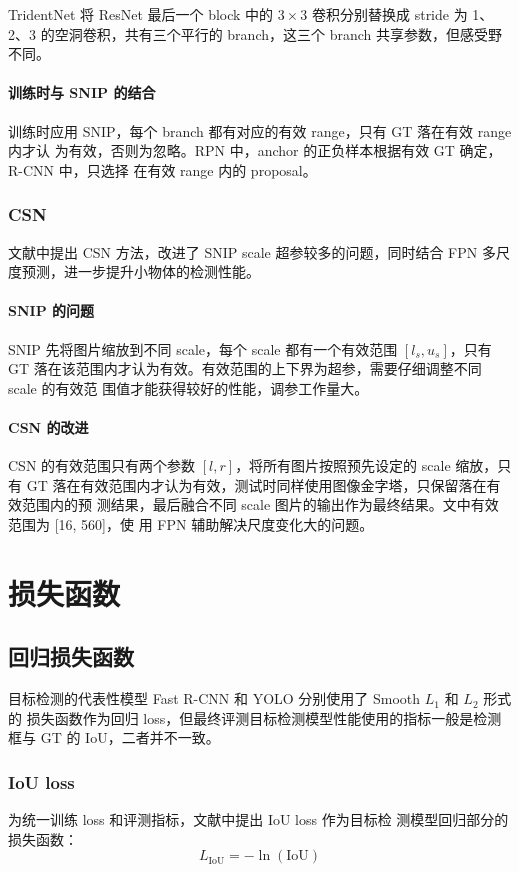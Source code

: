 TridentNet 将 ResNet 最后一个 block 中的 $3 \times 3$ 卷积分别替换成 stride 为
1、2、3 的空洞卷积，共有三个平行的 branch，这三个 branch 共享参数，但感受野不同。

\paragraph{训练时与 SNIP 的结合}
训练时应用 SNIP，每个 branch 都有对应的有效 range，只有 GT 落在有效 range 内才认
为有效，否则为忽略。RPN 中，anchor 的正负样本根据有效 GT 确定，R-CNN 中，只选择
在有效 range 内的 proposal。

\subsubsection{CSN}
文献中提出 CSN 方法，改进了 SNIP scale 超参较多的问题，同时结合
FPN 多尺度预测，进一步提升小物体的检测性能。 

\paragraph{SNIP 的问题}
SNIP 先将图片缩放到不同 scale，每个 scale 都有一个有效范围 $[l_s, u_s]$，只有 GT
落在该范围内才认为有效。有效范围的上下界为超参，需要仔细调整不同 scale 的有效范
围值才能获得较好的性能，调参工作量大。

\paragraph{CSN 的改进}
CSN 的有效范围只有两个参数 $[l, r]$，将所有图片按照预先设定的 scale 缩放，只有
GT 落在有效范围内才认为有效，测试时同样使用图像金字塔，只保留落在有效范围内的预
测结果，最后融合不同 scale 图片的输出作为最终结果。文中有效范围为 [16, 560]，使
用 FPN 辅助解决尺度变化大的问题。

\section{损失函数}
\subsection{回归损失函数}
目标检测的代表性模型 Fast R-CNN 和 YOLO 分别使用了 Smooth $L_1$ 和 $L_2$ 形式的
损失函数作为回归 loss，但最终评测目标检测模型性能使用的指标一般是检测框与 GT 的
IoU，二者并不一致。

\subsubsection{IoU loss}
为统一训练 loss 和评测指标，文献中提出 IoU loss 作为目标检
测模型回归部分的损失函数：
\begin{equation}
  L_{\mathrm{IoU}} = - \ln (\mathrm{IoU})
\end{equation}

